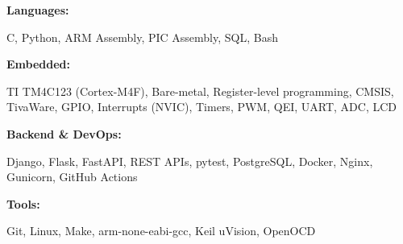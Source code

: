 \documentclass[9pt]{developercv} %
\begin{document}
\vspace{-6pt}

\begin{minipage}[t]{0.19\textwidth}
    \textbf{Languages:}
\end{minipage}
\begin{minipage}[t]{0.8\textwidth}
    C, Python, ARM Assembly, PIC Assembly, SQL, Bash
\end{minipage}
\vspace{1mm}

\begin{minipage}[t]{0.19\textwidth}
    \textbf{Embedded:}
\end{minipage}
\begin{minipage}[t]{0.8\textwidth}
    TI TM4C123 (Cortex-M4F), Bare-metal, Register-level programming, CMSIS, TivaWare, GPIO, Interrupts (NVIC), Timers, PWM, QEI, UART, ADC, LCD
\end{minipage}
\vspace{1mm}

\begin{minipage}[t]{0.19\textwidth}
    \textbf{Backend \& DevOps:}
\end{minipage}
\begin{minipage}[t]{0.8\textwidth}
    Django, Flask, FastAPI, REST APIs, pytest, PostgreSQL, Docker, Nginx, Gunicorn, GitHub Actions
\end{minipage}
\vspace{1mm}

\begin{minipage}[t]{0.19\textwidth}
    \textbf{Tools:}
\end{minipage}
\begin{minipage}[t]{0.8\textwidth}
    Git, Linux, Make, arm-none-eabi-gcc, Keil uVision, OpenOCD
\end{minipage}
\end{document}
